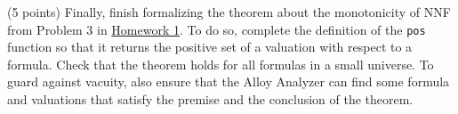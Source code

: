 \documentclass{handout}
\begin{document}
\begin{questions}
\item (5 points) \label{prob:alloy:last} Finally, finish formalizing the theorem
about the monotonicity of NNF from Problem 3 in
\href{\website/doc/hw1.pdf}{Homework 1}. To do so, complete the definition of
the \texttt{pos} function so that it returns the positive  set of a valuation
with respect to a formula. Check that the theorem holds for all formulas in a
small universe. To guard against vacuity, also ensure that the Alloy Analyzer
can find some formula and valuations that satisfy the premise and the
conclusion of the theorem.

\end{questions}
\end{document}
